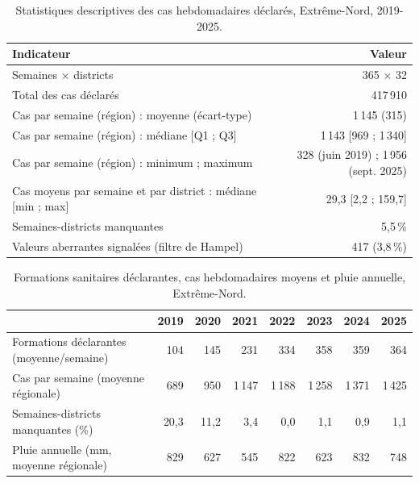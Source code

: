 \documentclass[11pt]{article}
\begin{document}
\begin{table}[!htbp]\centering\small
\caption{Statistiques descriptives des cas hebdomadaires déclarés, Extrême-Nord, 2019-2025.}\label{tab:desc}
\begin{tabularx}{\linewidth}{@{}L r@{}}\toprule
Indicateur & Valeur \\\midrule
Semaines × districts & 365 × 32 \\
Total des cas déclarés & 417\,910 \\
Cas par semaine (région) : moyenne (écart-type) & 1\,145 (315) \\
Cas par semaine (région) : médiane [Q1 ; Q3] & 1\,143 [969 ; 1\,340] \\
Cas par semaine (région) : minimum ; maximum & 328 (juin 2019) ; 1\,956 (sept. 2025) \\
Cas moyens par semaine et par district : médiane [min ; max] & 29,3 [2,2 ; 159,7] \\
Semaines-districts manquantes & 5,5\,\% \\
Valeurs aberrantes signalées (filtre de Hampel) & 417 (3,8\,\%) \\\bottomrule
\end{tabularx}
\end{table}

\begin{table}[!htbp]\centering\small
\caption{Formations sanitaires déclarantes, cas hebdomadaires moyens et pluie annuelle, Extrême-Nord.}\label{tab:fac}
\begin{tabular}{@{}lrrrrrrr@{}}\toprule
 & 2019 & 2020 & 2021 & 2022 & 2023 & 2024 & 2025 \\\midrule
Formations déclarantes (moyenne/semaine) & 104 & 145 & 231 & 334 & 358 & 359 & 364 \\
Cas par semaine (moyenne régionale) & 689 & 950 & 1\,147 & 1\,188 & 1\,258 & 1\,371 & 1\,425 \\
Semaines-districts manquantes (\%) & 20,3 & 11,2 & 3,4 & 0,0 & 1,1 & 0,9 & 1,1 \\
Pluie annuelle (mm, moyenne régionale) & 829 & 627 & 545 & 822 & 623 & 832 & 748 \\\bottomrule
\end{tabular}
\end{table}

\end{document}
